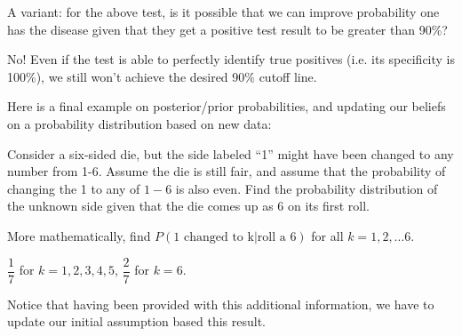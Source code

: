 \documentclass[../main.tex]{subfiles}
\begin{document}
\begin{example}
A variant: for the above test, is it possible that we can improve probability one has the disease given that they get a positive test result to be greater than 90\%? 
\end{example}

\begin{solution}[Answer]
No! Even if the test is able to perfectly identify true positives (i.e. its specificity is 100\%), we still won't achieve the desired 90\% cutoff line. 
\end{solution}

Here is a final example on posterior/prior probabilities, and updating our beliefs on a probability distribution based on new data: 
\begin{example} %
Consider a six-sided die, but the side labeled ``1'' might have been changed to any number from 1-6. Assume the die is still fair, and assume that the probability of changing the 1 to any of $1-6$ is also even. Find the probability distribution of the unknown side given that the die comes up as 6 on its first roll. 

More mathematically, find $P(\text{1 changed to k}|\text{roll a 6})$ for all $k = 1, 2, \ldots 6$. 
\end{example}

\begin{solution}[Answer.]
$\dfrac{1}{7}$ for $k = 1, 2, 3, 4, 5$, $\dfrac{2}{7}$ for $k = 6$. 
\end{solution}

\begin{solution} 
\end{solution}

Notice that having been provided with this additional information, we have to update our initial assumption based this result.  
\end{document}
